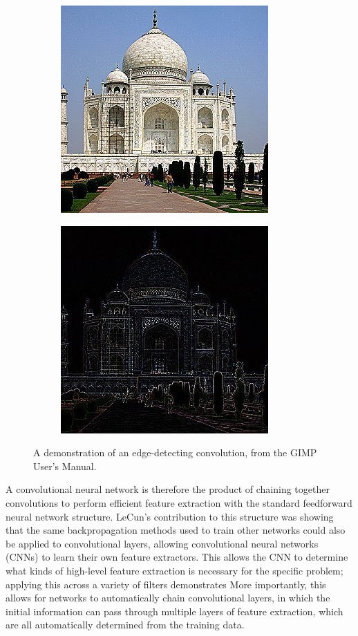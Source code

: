 \begin{figure}[!htb]
  \begin{subfigure}{0.5\textwidth}
    \centering
    \includegraphics{images/gimp_original}
  \end{subfigure}%
  \begin{subfigure}{0.5\textwidth}
    \centering
    \includegraphics{images/gimp_edgedetect}
  \end{subfigure}

  \caption{A demonstration of an edge-detecting convolution, from the GIMP User's Manual. \cite{gimpconvolution}}
  \label{fig:gimp_edge}
\end{figure}

A convolutional neural network is therefore the product of chaining together convolutions to perform efficient feature extraction with the standard feedforward neural network structure.
LeCun's contribution to this structure was showing that the same backpropagation methods used to train other networks could also be applied to convolutional layers, allowing convolutional neural networks (CNNs) to learn their own feature extractors.
This allows the CNN to determine what kinds of high-level feature extraction is necessary for the specific problem; applying this across a variety of filters demonstrates 
More importantly, this allows for networks to automatically chain convolutional layers, in which the initial information can pass through multiple layers of feature extraction, which are all automatically determined from the training data.

